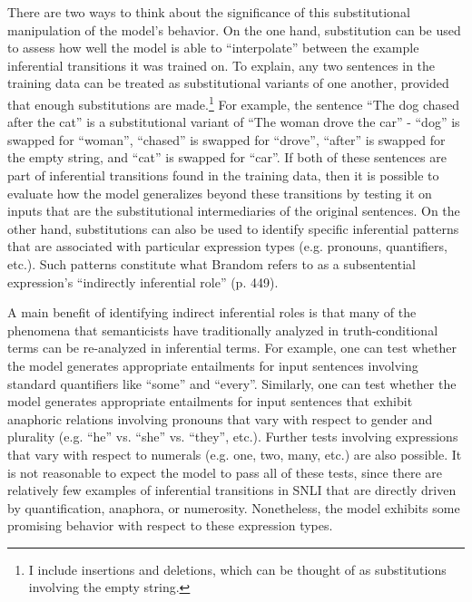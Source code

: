 There are two ways to think about the significance of this substitutional manipulation of the model's behavior. On the one hand, substitution can be used to assess how well the model is able to ``interpolate'' between the example inferential transitions it was trained on. To explain, any two sentences in the training data can be treated as substitutional variants of one another, provided that enough substitutions are made.\footnote{I include insertions and deletions, which can be thought of as substitutions involving the empty string.} For example, the sentence ``The dog chased after the cat'' is a substitutional variant of ``The woman drove the car'' - ``dog'' is swapped for ``woman'', ``chased'' is swapped for ``drove'', ``after'' is swapped for the empty string, and ``cat'' is swapped for ``car''. If both of these sentences are part of inferential transitions found in the training data, then it is possible to evaluate how the model generalizes beyond these transitions by testing it on inputs that are the substitutional intermediaries of the original sentences. On the other hand, substitutions can also be used to identify specific inferential patterns that are associated with particular expression types (e.g. pronouns, quantifiers, etc.). Such patterns constitute what Brandom refers to as a subsentential expression's ``indirectly inferential role'' (p. 449). 

A main benefit of identifying indirect inferential roles is that many of the phenomena that semanticists have traditionally analyzed in truth-conditional terms can be re-analyzed in inferential terms. For example, one can test whether the model generates appropriate entailments for input sentences involving standard quantifiers like ``some'' and ``every''. Similarly, one can test whether the model generates appropriate entailments for input sentences that exhibit anaphoric relations involving pronouns that vary with respect to gender and plurality (e.g. ``he'' vs. ``she'' vs. ``they'', etc.). Further tests involving expressions that vary with respect to numerals (e.g. one, two, many, etc.) are also possible. It is not reasonable to expect the model to pass all of these tests, since there are relatively few examples of inferential transitions in SNLI that are directly driven by quantification, anaphora, or numerosity. Nonetheless, the model exhibits some promising behavior with respect to these expression types.

